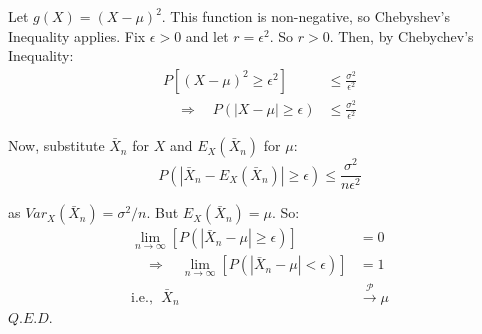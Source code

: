 \documentclass[12pt,a4paper]{article}
\newcommand{\imply}{\quad\Rightarrow\quad}
\renewcommand{\imply}{\quad\Rightarrow\quad}
\begin{document}
Let $g(X) = (X-\mu)^2$. This function is non-negative, so Chebyshev's Inequality applies. Fix $\epsilon>0$ and let $r=\epsilon^2$. So $r>0$. Then, by Chebychev's Inequality:
\begin{align*}
P\left[(X-\mu)^2 \geq \epsilon^2\right] &\leq \frac{\sigma^2}{\epsilon^2}\\
\imply P(|X-\mu|\geq \epsilon) &\leq \frac{\sigma^2}{\epsilon^2}
\end{align*}

Now, substitute $\bar{X}_n$ for $X$ and $E_X\left(\bar{X}_n\right)$ for $\mu$:
$$P\left(\left|\bar{X}_n - E_X\left(\bar{X}_n\right)\right|\geq \epsilon\right) \leq \frac{\sigma^2}{n\epsilon^2}$$

as $Var_X\left(\bar{X}_n\right) = \sigma^2/n$. But $E_X\left(\bar{X}_n\right) = \mu$. So:
\begin{align*}
\lim_{n\to\infty}\left[P\left(\left|\bar{X}_n-\mu\right|\geq \epsilon\right)\right] &= 0\\
\imply \lim_{n\to\infty}\left[P\left(\left|\bar{X}_n-\mu\right| < \epsilon\right)\right] &= 1\\
\text{i.e., } \;\bar{X}_n &\xrightarrow{\mathscr{P}} \mu
\end{align*}\hfill$Q.E.D.$
\end{document}
